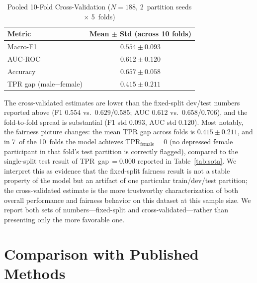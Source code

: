 \documentclass[journal]{IEEEtran}
\begin{document}
\begin{table}[t]
\centering
\renewcommand{\arraystretch}{1.15}
\caption{Pooled 10-Fold Cross-Validation ($N{=}188$, 2~partition seeds
$\times$ 5~folds)}
\label{tab:kfold}
\begin{tabular}{lc}
\toprule
\textbf{Metric} & \textbf{Mean $\pm$ Std (across 10 folds)} \\
\midrule
Macro-F1  & $0.554 \pm 0.093$ \\
AUC-ROC   & $0.612 \pm 0.120$ \\
Accuracy  & $0.657 \pm 0.058$ \\
TPR gap (male$-$female) & $0.415 \pm 0.211$ \\
\bottomrule
\end{tabular}
\end{table}

The cross-validated estimates are lower than the fixed-split dev/test
numbers reported above (F1 $0.554$ vs.\ $0.629$/$0.585$; AUC $0.612$
vs.\ $0.658$/$0.706$), and the fold-to-fold spread is substantial
(F1 std $0.093$, AUC std $0.120$). Most notably, the fairness picture
changes: the mean TPR gap across folds is $0.415\pm0.211$, and in
7~of the 10~folds the model achieves $\text{TPR}_\text{female}=0$
(no depressed female participant in that fold's test partition is
correctly flagged), compared to the single-split test result of
TPR~gap\,$=0.000$ reported in Table~\ref{tab:sota}. We interpret this
as evidence that the fixed-split fairness result is not a stable
property of the model but an artifact of one particular
train/dev/test partition; the cross-validated estimate is the more
trustworthy characterization of both overall performance and fairness
behavior on this dataset at this sample size. We report both sets of
numbers---fixed-split and cross-validated---rather than presenting
only the more favorable one.

\section{Comparison with Published Methods}
\label{sec:sota}
\end{document}
